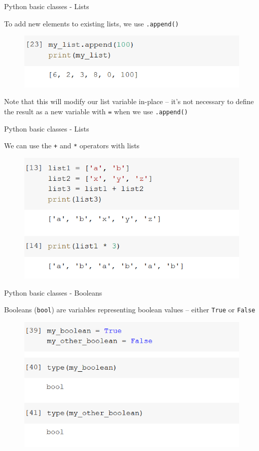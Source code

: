\documentclass[aspectratio=169]{beamer}
\begin{document}
\begin{frame}{Python basic classes - Lists}

	To add new elements to existing lists, we use \texttt{.append()}

	\begin{figure}
		\centering
		\includegraphics[width=0.6\linewidth]{img/list_append.png}
	\end{figure}

	Note that this will modify our list variable in-place -- it's not necessary to define the result as a new variable with \texttt{=} when we use \texttt{.append()}

\end{frame}

\begin{frame}{Python basic classes - Lists}

	We can use the \texttt{+} and \texttt{*} operators with lists

	\begin{figure}
		\centering
		\includegraphics[width=0.6\linewidth]{img/list_operations.png}
	\end{figure}

\end{frame}

\begin{frame}{Python basic classes - Booleans}

	Booleans (\texttt{bool}) are variables representing boolean values -- either \texttt{True} or \texttt{False}

	\begin{figure}
		\centering
		\includegraphics[width=0.6\linewidth]{img/bool.png}
	\end{figure}

\end{frame}
\end{document}
